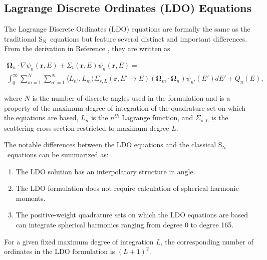 \documentclass{article} %
\newcommand{\bo}{\mathbf\Omega}
\newcommand{\vecr}{\textbf{r}}
\newcommand{\sn}{S$_\mathrm{N}$}
\begin{document}
\subsection{Lagrange Discrete Ordinates (LDO) Equations}

The Lagrange Discrete Ordinates (LDO) equations are formally the same as the
traditional \sn\ equations but feature several distinct and important
differences. From the derivation in Reference \cite{ahrens}, they are written
as

\begin{multline}
\bo_n\cdot\nabla\psi_{n}(\vecr,E) + 
\Sigma_{t}(\vecr,E)\psi_{n}(\vecr,E) = \\
\int_0^\infty\sum_{m=1}^{N}\sum_{n'=1}^{N}\langle L_{n'},L_{m}\rangle
\Sigma_{s,L}(\vecr,E'\rightarrow E)(\bo_{m}\cdot\bo_n)\psi_{n'}(E')dE'
+ Q_{n}(E),
\end{multline}

\noindent where $N$ is the number of discrete angles used in the formulation
and is a property of the maximum degree of integration of the quadrature set
on which the equations are based, $L_n$ is the $n^{th}$ Lagrange function, and
$\Sigma_{s,L}$ is the scattering cross section restricted to maximum degree
$L$.

The notable differences between the LDO equations and the classical \sn\
equations can be summarized as:

\begin{enumerate}
\item{The LDO solution has an interpolatory structure in angle.}
\item{The LDO formulation does not require calculation of spherical harmonic
      moments.}
\item{The positive-weight quadrature sets on which the LDO equations are based
      can integrate spherical harmonics ranging from degree 0 to degree 165.}
\end{enumerate}

For a given fixed maximum degree of integration $L$, the corresponding number
of ordinates in the LDO formulation is $(L+1)^2$.

\end{document}
